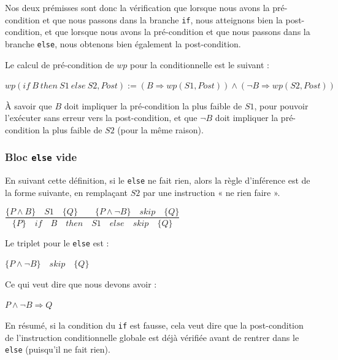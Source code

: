 \documentclass[12pt,francais,]{scrbook}
\begin{document}
Nos deux prémisses sont donc la vérification que lorsque nous avons la
pré-condition et que nous passons dans la branche \texttt{if}, nous
atteignons bien la post-condition, et que lorsque nous avons la
pré-condition et que nous passons dans la branche \texttt{else}, nous
obtenons bien également la post-condition.

Le calcul de pré-condition de \(wp\) pour la conditionnelle est le
suivant :

\begin{center}
\(wp(if\ B\ then\ S1\ else\ S2 , Post) := (B \Rightarrow wp(S1, Post)) \wedge (\neg B \Rightarrow wp(S2, Post))\)
\end{center}

À savoir que \(B\) doit impliquer la pré-condition la plus faible de
\(S1\), pour pouvoir l'exécuter sans erreur vers la post-condition, et
que \(\neg B\) doit impliquer la pré-condition la plus faible de \(S2\)
(pour la même raison).

\subsubsection{\texorpdfstring{Bloc \texttt{else}
vide}{Bloc else vide}}\label{bloc-else-vide}

En suivant cette définition, si le \texttt{else} ne fait rien, alors la
règle d'inférence est de la forme suivante, en remplaçant \(S2\) par une
instruction « ne rien faire ».

\begin{center}
\(\dfrac{\{P \wedge B\}\quad S1\quad \{Q\} \quad \quad \{P \wedge \neg B\}\quad skip\quad \{Q\}}{\{P\}\quad if\quad B\quad then\quad S1\quad else\quad skip \quad \{Q\}}\)
\end{center}

Le triplet pour le \texttt{else} est :

\begin{center} \(\{P \wedge \neg B\}\quad skip\quad \{Q\}\)
\end{center}

Ce qui veut dire que nous devons avoir :

\begin{center} \(P \wedge \neg B \Rightarrow Q\) \end{center}

En résumé, si la condition du \texttt{if} est fausse, cela veut dire que
la post-condition de l'instruction conditionnelle globale est déjà
vérifiée avant de rentrer dans le \texttt{else} (puisqu'il ne fait
rien).
\end{document}
